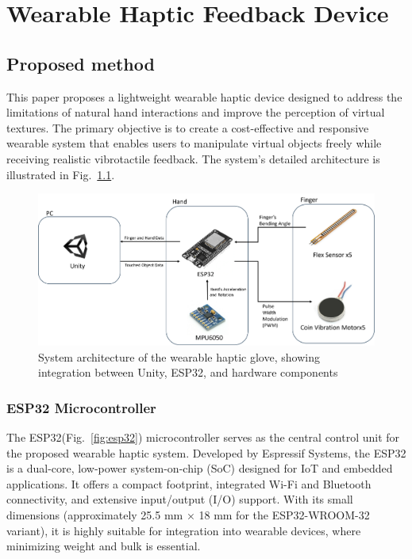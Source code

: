 \chapter{Wearable Haptic Feedback Device} %

\label{Chapter3} %
\section{Proposed method}
This paper proposes a lightweight wearable haptic device designed to address the limitations of natural hand interactions and improve the perception of virtual textures. The primary objective is to create a cost-effective and responsive wearable system that enables users to manipulate virtual objects freely while receiving realistic vibrotactile feedback. The system's detailed architecture is illustrated in Fig.~\ref{fig:system_diagram}.

\begin{figure}[H]\centering
	\includegraphics[width=1\textwidth]{Pictures/system_diagram.png}%
	\caption{System architecture of the wearable haptic glove, showing integration between Unity, ESP32, and hardware components}\label{fig:system_diagram}%
\end{figure}

\newpage
\subsection{ESP32 Microcontroller}
The ESP32(Fig.~\ref{fig:esp32}) microcontroller serves as the central control unit for the proposed wearable haptic system. Developed by Espressif Systems, the ESP32 is a dual-core, low-power system-on-chip (SoC) designed for IoT and embedded applications. It offers a compact footprint, integrated Wi-Fi and Bluetooth connectivity, and extensive input/output (I/O) support\cite{esp32docs}. With its small dimensions (approximately 25.5 mm × 18 mm for the ESP32-WROOM-32 variant), it is highly suitable for integration into wearable devices, where minimizing weight and bulk is essential.

